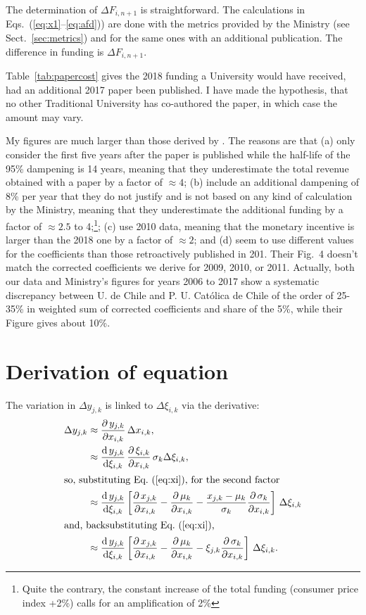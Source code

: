 \documentclass[twocolumn]{article}
\def\der#1#2{\frac{\mathrm{d}\,{#1}}{\mathrm{d}#2}}
\def\pder#1#2{\frac{\partial\,{#1}}{\partial#2}}
\def\eqref#1{Eq.~(\ref{eq:#1})}
\def\eqsref#1#2{Eqs.~(\ref{eq:#1}--\ref{eq:#2})}
\begin{document}
The determination of $\Delta F_{i,n+1}$ is straightforward.  The calculations
in \eqsref{x1}{afd}) are done with the metrics provided by the
Ministry (see Sect.~\ref{sec:metrics}) and for the same ones with an additional
publication.  The difference in funding is $\Delta F_{i,n+1}$. 

Table~\ref{tab:papercost} gives the 2018 funding a University would have received, had an additional 2017 paper been published.  I have made the hypothesis, that no other Traditional University has co-authored the paper, in which case the
amount may vary. 

My figures are much larger than those derived by \citet{RAM12}.  The reasons are that (a) only consider the first five years after the paper is published while the half-life of the 95\% dampening is 14 years, meaning that they underestimate the total revenue obtained with a paper by a factor of $\approx 4$; (b) include an additional dampening of 8\% per year that they do not justify and is not based on any kind of calculation by the Ministry, meaning that they underestimate the additional funding by a factor of $\approx 2.5$ to 4;\footnote{Quite the contrary, the constant increase of the total funding (consumer price index +2\%) calls for an amplification of 2\%}; (c) use 2010 data, meaning that the monetary incentive is larger than the 2018 one by a factor of $\approx 2$; and (d) seem to use different values for the coefficients than those retroactively published in 201. Their Fig.~4 doesn't match the corrected coefficients we derive for 2009, 2010, or 2011. Actually, both our data and Ministry's figures for years 2006 to 2017 show a systematic discrepancy between U. de Chile and P. U. Católica de Chile of the order of 25-35\%  in weighted sum of corrected coefficients and share of the 5\%, while their Figure gives about 10\%.
 
\appendix
\section{Derivation of equation}
\label{sec:calculus}
The variation in $\Delta y_{j,k}$ is linked to $\Delta \xi_{i,k}$ via the
derivative:
\begin{align}
    \Delta y_{j,k} 
        &\approx \pder{y_{j,k}}{x_{i,k}}
                 \, \Delta x_{i,k},\\
        &\approx \der{y_{j,k}}{\xi_{i,k}}
                 \, \pder{\xi_{i,k}}{x_{i,k}}
                 \, \sigma_k \Delta \xi_{i,k},\\
\intertext{so, substituting \eqref{xi}, for the second factor}
        &\approx \der{y_{j,k}}{\xi_{i,k}}
                 \left[
                    \pder{x_{j,k}}{x_{i,k}}
                  - \pder{\mu_k}{x_{i,k}} 
                  - \frac{x_{j,k}-\mu_k}{\sigma_k}\pder{\sigma_k}{x_{i,k}} 
                 \right] 
                 \, \Delta \xi_{i,k}\\
\intertext{and, backsubstituting \eqref{xi},}
        &\approx \der{y_{j,k}}{\xi_{i,k}}
                 \left[
                    \pder{x_{j,k}}{x_{i,k}}
                  - \pder{\mu_k}{x_{i,k}}
                  - \xi_{j,k} \pder{\sigma_k}{x_{i,k}}
                 \right]
                 \, \Delta \xi_{i,k}.
\end{align}
\end{document}
